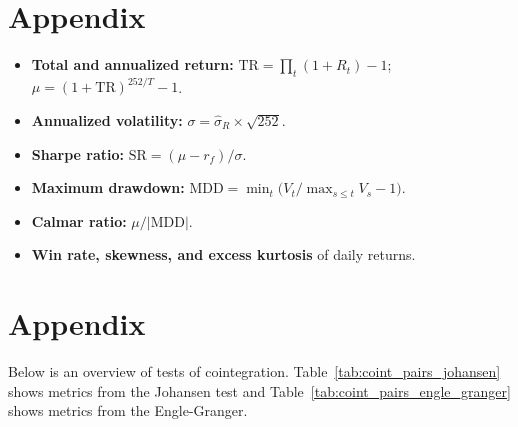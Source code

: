 \documentclass[12pt, a4paper]{article}
\begin{document}
\newpage

\section{Appendix}
\label{sec:metrics_app}
\begin{itemize}
    \item \textbf{Total and annualized return:}
          $\mathrm{TR} = \prod_t(1+R_t) - 1$;\quad
          $\mu = (1+\mathrm{TR})^{252/T} - 1$.
    \item \textbf{Annualized volatility:}
          $\sigma = \hat{\sigma}_{R} \times \sqrt{252}$.
    \item \textbf{Sharpe ratio:}
          $\mathrm{SR} = (\mu - r_f) / \sigma$.
    \item \textbf{Maximum drawdown:}
          $\mathrm{MDD} = \min_t \bigl(V_t / \max_{s \leq t} V_s - 1\bigr)$.
    \item \textbf{Calmar ratio:} $\mu / |\mathrm{MDD}|$.
    \item \textbf{Win rate, skewness, and excess kurtosis} of daily returns.
\end{itemize}

\newpage
\section{Appendix}
\label{sec:cointegration_app}
Below is an overview of tests of cointegration. Table~\ref{tab:coint_pairs_johansen} shows metrics from the Johansen test and Table~\ref{tab:coint_pairs_engle_granger} shows metrics from the Engle-Granger. 
\end{document}
